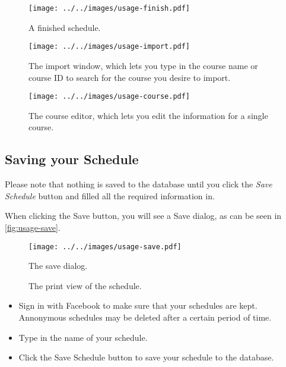 \begin{figure}[h]
  \centering\texttt{[image: ../../images/usage-finish.pdf]}
  \caption{A finished schedule.}
  \label{fig:usage-finish}
\end{figure}

\begin{figure}[p]
  \centering\texttt{[image: ../../images/usage-import.pdf]}
  \caption{The import window,
    which lets you type in the course name or course ID
    to search for the course you desire to import.}
  \label{fig:usage-import}
\end{figure}

\begin{figure}[p]
  \centering\texttt{[image: ../../images/usage-course.pdf]}
  \caption{The course editor,
    which lets you edit the information for a single course.}
  \label{fig:usage-course}
\end{figure}


\FloatBarrier
\subsection{Saving your Schedule}
\label{subsec:save}

Please note that nothing is saved to the database
until you click the \emph{Save Schedule} button
and filled all the required information in.

When clicking the Save button, you will see a Save dialog,
as can be seen in \autoref{fig:usage-save}.

\begin{figure}[h]
  \centering\texttt{[image: ../../images/usage-save.pdf]}
  \caption{The save dialog.}
  \label{fig:usage-save}
\end{figure}

\begin{figure}[b!]
  \centering{}
  \caption{The print view of the schedule.}
  \label{fig:usage-done}
\end{figure}

\begin{itemize}
  \item
    Sign in with Facebook to make sure
    that your schedules are kept.
    Annonymous schedules may be deleted after a certain period of time.
  \item
    Type in the name of your schedule.
  \item
    Click the Save Schedule button to save your schedule to the database.
\end{itemize}


